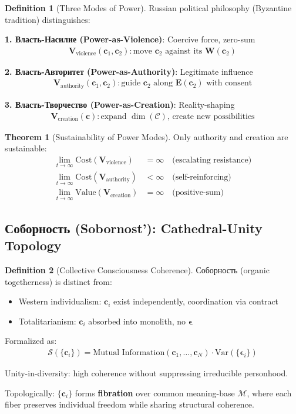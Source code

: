 \documentclass[11pt,a4paper]{article}
\theoremstyle{definition}
\newtheorem{definition}{Definition}[section]
\newtheorem{theorem}{Theorem}[section]
\theoremstyle{remark}
\newcommand{\CC}{\mathcal{C}}
\newcommand{\EE}{\mathbf{E}}
\newcommand{\WW}{\mathbf{W}}
\newcommand{\VV}{\mathbf{V}}
\newcommand{\cc}{\mathbf{c}}
\begin{document}
\begin{definition}[Three Modes of Power]
Russian political philosophy (Byzantine tradition) distinguishes:

\textbf{1. Власть-Насилие (Power-as-Violence)}: Coercive force, zero-sum
\begin{align}
\VV_{\text{violence}}(\cc_1, \cc_2): \text{move } \cc_2 \text{ against its } \WW(\cc_2)
\end{align}

\textbf{2. Власть-Авторитет (Power-as-Authority)}: Legitimate influence
\begin{align}
\VV_{\text{authority}}(\cc_1, \cc_2): \text{guide } \cc_2 \text{ along } \EE(\cc_2) \text{ with consent}
\end{align}

\textbf{3. Власть-Творчество (Power-as-Creation)}: Reality-shaping
\begin{align}
\VV_{\text{creation}}(\cc): \text{expand } \dim(\CC) \text{, create new possibilities}
\end{align}
\end{definition}

\begin{theorem}[Sustainability of Power Modes]
Only authority and creation are sustainable:
\begin{align}
\lim_{t \to \infty} \text{Cost}(\VV_{\text{violence}}) &= \infty \quad \text{(escalating resistance)} \\
\lim_{t \to \infty} \text{Cost}(\VV_{\text{authority}}) &< \infty \quad \text{(self-reinforcing)} \\
\lim_{t \to \infty} \text{Value}(\VV_{\text{creation}}) &= \infty \quad \text{(positive-sum)}
\end{align}
\end{theorem}

\subsection{Соборность (Sobornost'): Cathedral-Unity Topology}

\begin{definition}[Collective Consciousness Coherence]
Соборность (organic togetherness) is distinct from:
\begin{itemize}
\item Western individualism: \(\cc_i\) exist independently, coordination via contract
\item Totalitarianism: \(\cc_i\) absorbed into monolith, no \(\boldsymbol{\epsilon}\)
\end{itemize}

Formalized as:
\begin{align}
\mathcal{S}(\{\cc_i\}) = \text{Mutual Information}(\cc_1, \ldots, \cc_N) \cdot \text{Var}(\{\boldsymbol{\epsilon}_i\})
\end{align}

Unity-in-diversity: high coherence without suppressing irreducible personhood.

Topologically: \(\{\cc_i\}\) forms \textbf{fibration} over common meaning-base \(\mathcal{M}\), where each fiber preserves individual freedom while sharing structural coherence.
\end{definition}
\end{document}
